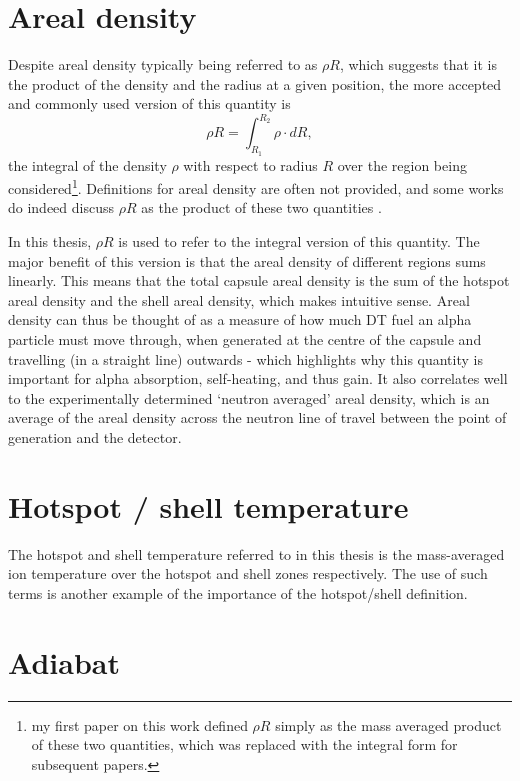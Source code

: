 \section{Areal density}

Despite areal density typically being referred to as $\rho R$, which suggests that it is the product of the density and the radius at a given position, the more accepted and commonly used version \cite{Craxton2005, Betti2005, Abu-Shawareb2022} of this quantity is \begin{equation} \rho R = \int_{R_1}^{R_2} \rho \cdot dR, \end{equation} the integral of the density $\rho$ with respect to radius $R$ over the region being considered\footnote{my first paper on this work defined $\rho R$ simply as the mass averaged product of these two quantities, which was replaced with the integral form for subsequent papers.}. Definitions for areal density are often not provided, and some works do indeed discuss $\rho R$ as the product of these two quantities \cite{Atzeni2008}.

In this thesis, $\rho R$ is used to refer to the integral version of this quantity. The major benefit of this version is that the areal density of different regions sums linearly. This means that the total capsule areal density is the sum of the hotspot areal density and the shell areal density, which makes intuitive sense. Areal density can thus be thought of as a measure of how much DT fuel an alpha particle must move through, when generated at the centre of the capsule and travelling (in a straight line) outwards - which highlights why this quantity is important for alpha absorption, self-heating, and thus gain. It also correlates well to the experimentally determined `neutron averaged' areal density, which is an average of the areal density across the neutron line of travel between the point of generation and the detector.

\section{Hotspot / shell temperature}
The hotspot and shell temperature referred to in this thesis is the mass-averaged ion temperature over the hotspot and shell zones respectively. The use of such terms is another example of the importance of the hotspot/shell definition.

\section{Adiabat}

